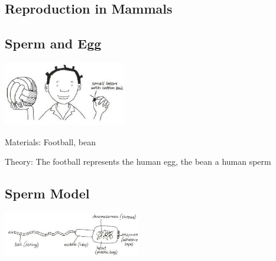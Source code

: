 \begin{multicols}{2}

\section*{Reproduction in Mammals}


\subsection{Sperm and Egg} %

\begin{center}
\includegraphics[width=0.4\textwidth]{./img/vso/sperm-egg.jpg}
\end{center}

\begin{description*}
\item[Materials:]{Football, bean}
\item[Theory:]{The football represents the
human egg, the bean a human
sperm}
\end{description*}

\subsection{Sperm Model}

\begin{center}
\includegraphics[width=0.45\textwidth]{./img/vso/sperm-model.jpg}
\end{center}


\end{multicols}
